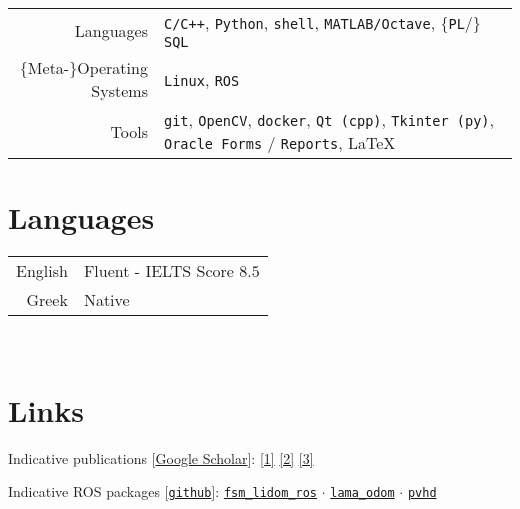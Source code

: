 \documentclass[a4paper,10pt,twoside]{article}
\begin{document}
\begin{tabular}{rp{12cm}}
Languages & \texttt{C/C++}, \texttt{Python}, \texttt{shell}, \texttt{MATLAB/Octave}, $\{$\texttt{PL}/$\}$\texttt{SQL}\\
$\{$Meta-$\}$Operating Systems & \texttt{Linux}, \texttt{ROS} \\
Tools & \texttt{git}, \texttt{OpenCV}, \texttt{docker}, \texttt{Qt (cpp)}, \texttt{Tkinter (py)}, \texttt{Oracle Forms} / \texttt{Reports}, \LaTeX\\
\end{tabular}%



\section{Languages}

\begin{tabular}{rp{12cm}}
English & Fluent - IELTS Score $8.5$ \\
Greek & Native \\
\end{tabular} \\


\section{Links}

Indicative publications [\href{https://scholar.google.com/citations?view\_op=list\_works\&hl=en\&user=9\_hI4hMAAAAJ}{Google Scholar}]:
\href{https://ieeexplore.ieee.org/abstract/document/9981228}{[1]}
\href{https://www.sciencedirect.com/science/article/abs/pii/S0921889021002323}{[2]}
\href{https://www.tandfonline.com/doi/full/10.1080/00207179.2018.1514129}{[3]}

Indicative ROS packages [\href{https://github.com/li9i}{\texttt{github}}]:
\href{https://github.com/li9i/fsm\_lidom\_ros}{\texttt{fsm\_lidom\_ros}} $\cdot$
\href{https://github.com/li9i/lama\_odom}{\texttt{lama\_odom}} $\cdot$
\href{https://github.com/li9i/pandora\_vision\_2014/tree/hydro-devel/pandora\_vision\_hole\_detector}{\texttt{pvhd}}
\end{document}
